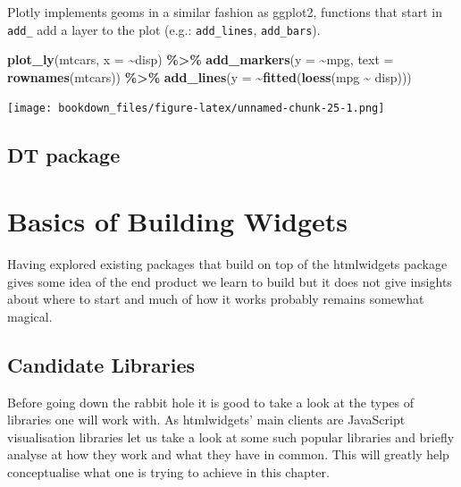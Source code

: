 \documentclass[
]{krantz}
\makeatletter
\newenvironment{Shaded}{\begin{snugshade}}{\end{snugshade}}
\newcommand{\DataTypeTok}[1]{\textcolor[rgb]{0.27,0.27,0.27}{#1}}
\newcommand{\KeywordTok}[1]{\textcolor[rgb]{0.27,0.27,0.27}{\textbf{#1}}}
\newcommand{\NormalTok}[1]{#1}
\newcommand{\OperatorTok}[1]{\textcolor[rgb]{0.43,0.43,0.43}{\textbf{#1}}}
\newcommand{\StringTok}[1]{\textcolor[rgb]{0.5,0.5,0.5}{#1}}
\newenvironment{kframe}{%
\medskip{}
\setlength{\fboxsep}{.8em}
 \def\at@end@of@kframe{}%
 \ifinner\ifhmode%
  \def\at@end@of@kframe{\end{minipage}}%
  \begin{minipage}{\columnwidth}%
 \fi\fi%
 \def\FrameCommand##1{\hskip\@totalleftmargin \hskip-\fboxsep
 \colorbox{shadecolor}{##1}\hskip-\fboxsep
     \hskip-\linewidth \hskip-\@totalleftmargin \hskip\columnwidth}%
 \MakeFramed {\advance\hsize-\width
   \@totalleftmargin\z@ \linewidth\hsize
   \@setminipage}}%
 {\par\unskip\endMakeFramed%
 \at@end@of@kframe}
\renewenvironment{Shaded}{\begin{kframe}}{\end{kframe}}
\makeatother
\begin{document}
Plotly implements geoms in a similar fashion as ggplot2, functions that start in \texttt{add\_} add a layer to the plot (e.g.: \texttt{add\_lines}, \texttt{add\_bars}).

\begin{Shaded}
\begin{Highlighting}[]
\KeywordTok{plot\_ly}\NormalTok{(mtcars, }\DataTypeTok{x =} \OperatorTok{\textasciitilde{}}\NormalTok{disp) }\OperatorTok{\%\textgreater{}\%}\StringTok{ }
\StringTok{  }\KeywordTok{add\_markers}\NormalTok{(}\DataTypeTok{y =} \OperatorTok{\textasciitilde{}}\NormalTok{mpg, }\DataTypeTok{text =} \KeywordTok{rownames}\NormalTok{(mtcars)) }\OperatorTok{\%\textgreater{}\%}\StringTok{ }
\StringTok{  }\KeywordTok{add\_lines}\NormalTok{(}\DataTypeTok{y =} \OperatorTok{\textasciitilde{}}\KeywordTok{fitted}\NormalTok{(}\KeywordTok{loess}\NormalTok{(mpg }\OperatorTok{\textasciitilde{}}\StringTok{ }\NormalTok{disp)))}
\end{Highlighting}
\end{Shaded}

\texttt{[image: bookdown\_files/figure-latex/unnamed-chunk-25-1.png]}

\hypertarget{widgets-intro-dt}{%
\section{DT package}\label{widgets-intro-dt}}

\hypertarget{widgets-basics}{%
\chapter{Basics of Building Widgets}\label{widgets-basics}}

Having explored existing packages that build on top of the htmlwidgets package gives some idea of the end product we learn to build but it does not give insights about where to start and much of how it works probably remains somewhat magical.

\hypertarget{widgets-basics-candidates}{%
\section{Candidate Libraries}\label{widgets-basics-candidates}}

Before going down the rabbit hole it is good to take a look at the types of libraries one will work with. As htmlwidgets' main clients are JavaScript visualisation libraries let us take a look at some such popular libraries and briefly analyse at how they work and what they have in common. This will greatly help conceptualise what one is trying to achieve in this chapter.
\end{document}
